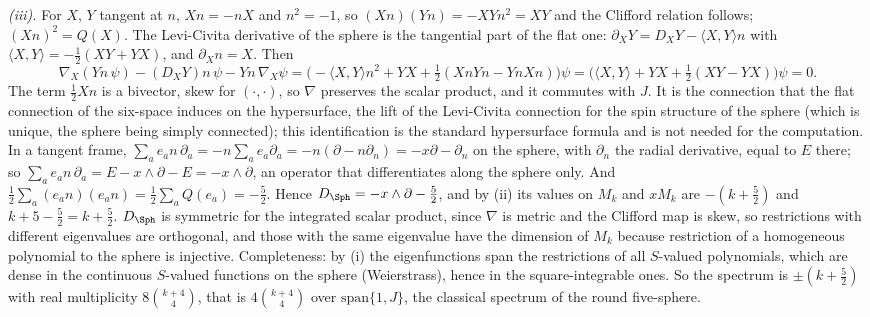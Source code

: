 \emph{(iii).} For $X$, $Y$ tangent at $n$, $Xn = -nX$ and $n^{2} = -1$, so $(Xn)(Yn) = -XYn^{2} = XY$ and the Clifford relation follows; $(Xn)^{2} = Q(X)$. The Levi-Civita derivative of the sphere is the tangential part of the flat one: $\partial_{X}Y = D_{X}Y - \langle X, Y\rangle n$ with $\langle X, Y\rangle = -\tfrac12(XY + YX)$, and $\partial_{X}n = X$. Then
\[
\nabla_{X}(Yn\,\psi) - (D_{X}Y)n\,\psi - Yn\,\nabla_{X}\psi = \bigl(-\langle X, Y\rangle n^{2} + YX + \tfrac12(XnYn - YnXn)\bigr)\psi = \bigl(\langle X, Y\rangle + YX + \tfrac12(XY - YX)\bigr)\psi = 0 .
\]
The term $\tfrac12Xn$ is a bivector, skew for $(\cdot, \cdot)$, so $\nabla$ preserves the scalar product, and it commutes with $J$. It is the connection that the flat connection of the six-space induces on the hypersurface, the lift of the Levi-Civita connection for the spin structure of the sphere (which is unique, the sphere being simply connected); this identification is the standard hypersurface formula and is not needed for the computation. In a tangent frame, $\sum_{a}e_{a}n\,\partial_{a} = -n\sum_{a}e_{a}\partial_{a} = -n(\partial - n\partial_{n}) = -x\partial - \partial_{n}$ on the sphere, with $\partial_{n}$ the radial derivative, equal to $E$ there; so $\sum_{a}e_{a}n\,\partial_{a} = E - x \wedge \partial - E = -x \wedge \partial$, an operator that differentiates along the sphere only. And $\tfrac12\sum_{a}(e_{a}n)(e_{a}n) = \tfrac12\sum_{a}Q(e_{a}) = -\tfrac52$. Hence $D_{\Sph} = -x \wedge \partial - \tfrac52$, and by (ii) its values on $M_{k}$ and $xM_{k}$ are $-(k + \tfrac52)$ and $k + 5 - \tfrac52 = k + \tfrac52$. $D_{\Sph}$ is symmetric for the integrated scalar product, since $\nabla$ is metric and the Clifford map is skew, so restrictions with different eigenvalues are orthogonal, and those with the same eigenvalue have the dimension of $M_{k}$ because restriction of a homogeneous polynomial to the sphere is injective. Completeness: by (i) the eigenfunctions span the restrictions of all $S$-valued polynomials, which are dense in the continuous $S$-valued functions on the sphere (Weierstrass), hence in the square-integrable ones. So the spectrum is $\pm(k + \tfrac52)$ with real multiplicity $8\binom{k+4}{4}$, that is $4\binom{k+4}{4}$ over $\mathrm{span}\{1, J\}$, the classical spectrum of the round five-sphere.

